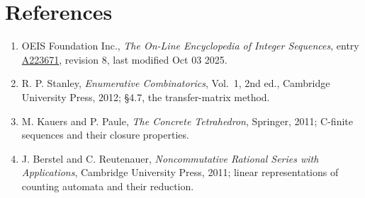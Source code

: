 \documentclass[11pt]{article}
\theoremstyle{definition}
\begin{document}
\section{References}

\begin{enumerate}

\item OEIS Foundation Inc., \emph{The On-Line Encyclopedia of Integer Sequences}, entry \href{https://oeis.org/A223671}{A223671}, revision 8, last modified Oct 03 2025.

\item R. P. Stanley, \emph{Enumerative Combinatorics}, Vol.~1, 2nd ed., Cambridge University Press, 2012; \S4.7, the transfer-matrix method.

\item M. Kauers and P. Paule, \emph{The Concrete Tetrahedron}, Springer, 2011; C-finite sequences and their closure properties.

\item J. Berstel and C. Reutenauer, \emph{Noncommutative Rational Series with Applications}, Cambridge University Press, 2011; linear representations of counting automata and their reduction.

\end{enumerate}
\end{document}
